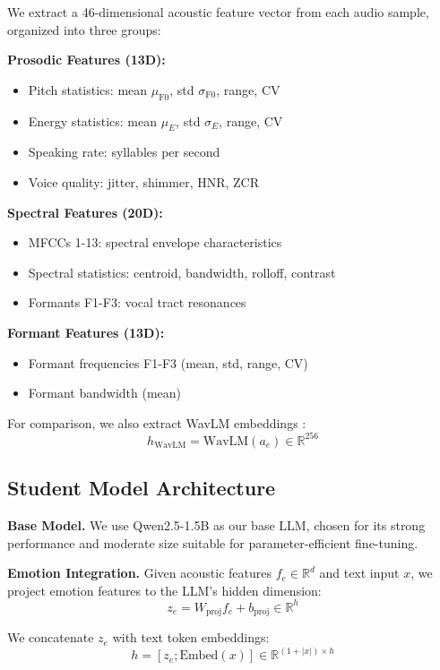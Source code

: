 We extract a 46-dimensional acoustic feature vector from each audio sample, organized into three groups:

\textbf{Prosodic Features (13D):} 
\begin{itemize}
    \item Pitch statistics: mean $\mu_{\text{F0}}$, std $\sigma_{\text{F0}}$, range, CV
    \item Energy statistics: mean $\mu_E$, std $\sigma_E$, range, CV  
    \item Speaking rate: syllables per second
    \item Voice quality: jitter, shimmer, HNR, ZCR
\end{itemize}

\textbf{Spectral Features (20D):}
\begin{itemize}
    \item MFCCs 1-13: spectral envelope characteristics
    \item Spectral statistics: centroid, bandwidth, rolloff, contrast
    \item Formants F1-F3: vocal tract resonances
\end{itemize}

\textbf{Formant Features (13D):}
\begin{itemize}
    \item Formant frequencies F1-F3 (mean, std, range, CV)
    \item Formant bandwidth (mean)
\end{itemize}

For comparison, we also extract WavLM embeddings \cite{chen2022wavlm}: 
$$h_{\text{WavLM}} = \text{WavLM}(a_e) \in \mathbb{R}^{256}$$

\subsection{Student Model Architecture}

\textbf{Base Model.} We use Qwen2.5-1.5B \cite{qwen2023} as our base LLM, chosen for its strong performance and moderate size suitable for parameter-efficient fine-tuning.

\textbf{Emotion Integration.} Given acoustic features $f_e \in \mathbb{R}^d$ and text input $x$, we project emotion features to the LLM's hidden dimension:
$$z_e = W_{\text{proj}} f_e + b_{\text{proj}} \in \mathbb{R}^{h}$$

We concatenate $z_e$ with text token embeddings:
$$h = [z_e; \text{Embed}(x)] \in \mathbb{R}^{(1+|x|) \times h}$$

